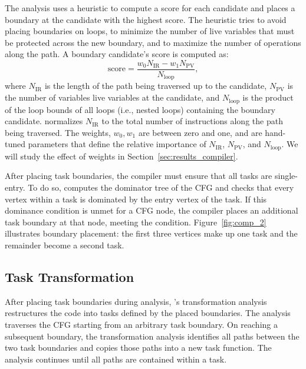 The analysis uses a heuristic to compute a score for each candidate and places
a boundary at the candidate with the highest score. The heuristic tries to
avoid placing boundaries on loops, to minimize the number of live variables
that must be protected across the new boundary, and to maximize the number of
operations along the path.  A boundary candidate's score is computed as:
%
\begin{equation}
\text{score} = \frac{w_{0} N_{\text{IR}} - w_{1} N_{\text{PV}}}{N_{\text{loop}}},\nonumber
\end{equation}
%
where $N_{\text{IR}}$ is the length of the path being traversed up to the
candidate, $N_{\text{PV}}$ is the number of variables live variables at the
candidate, and $N_{\text{loop}}$ is the product of the loop bounds of all loops
(i.e., nested loops) containing the boundary candidate. \sys normalizes $N_{\text{IR}}$ to the
total number of instructions along the path being traversed. The weights, $w_{0},
w_{1}$ are between zero and one, and are hand-tuned parameters that define the
relative importance of $N_{\text{IR}}$, $N_{\text{PV}}$, and $N_{\text{loop}}$.
We will study the effect of weights in Section~\ref{sec:results_compiler}. 

After placing task boundaries, the compiler must ensure that all tasks are
single-entry.  To do so, \sys computes the dominator tree of the CFG and checks
that every vertex within a task is dominated by the entry vertex of the task.
If this dominance condition is unmet for a CFG node, the compiler places
an additional task boundary at that node, meeting the condition.
%
Figure~\ref{fig:comp_2} illustrates boundary placement: the first three
vertices make up one task and the remainder become a second task.



\subsection{Task Transformation}
\label{sec:compiler_transform_pass}


After placing task boundaries during analysis, \sys's transformation analysis
restructures the code into tasks defined by the placed boundaries. The analysis
traverses the CFG starting from an arbitrary task boundary.  On reaching a
subsequent boundary, the transformation analysis identifies all paths between
the two task boundaries and copies those paths into a new task function.  The
analysis continues until all paths are contained within a task. 


